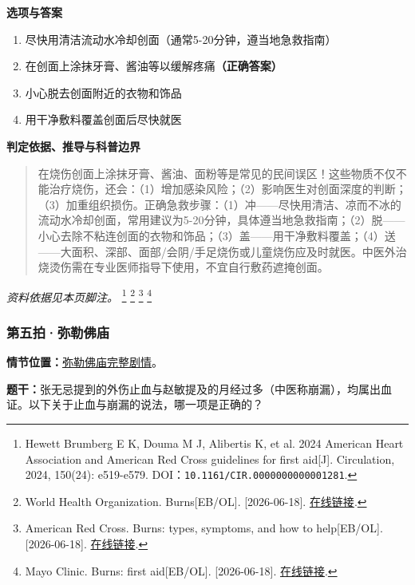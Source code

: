 \textbf{选项与答案}
\begin{enumerate}[label=\Alph*.,leftmargin=*]
  \item 尽快用清洁流动水冷却创面（通常5-20分钟，遵当地急救指南）
  \item 在创面上涂抹牙膏、酱油等以缓解疼痛\textbf{（正确答案）}
  \item 小心脱去创面附近的衣物和饰品
  \item 用干净敷料覆盖创面后尽快就医
\end{enumerate}
\textbf{判定依据、推导与科普边界}
\begin{quote}在烧伤创面上涂抹牙膏、酱油、面粉等是常见的民间误区！这些物质不仅不能治疗烧伤，还会：（1）增加感染风险；（2）影响医生对创面深度的判断；（3）加重组织损伤。正确急救步骤：（1）冲——尽快用清洁、凉而不冰的流动水冷却创面，常用建议为5-20分钟，具体遵当地急救指南；（2）脱——小心去除不粘连创面的衣物和饰品；（3）盖——用干净敷料覆盖；（4）送——大面积、深部、面部/会阴/手足烧伤或儿童烧伤应及时就医。中医外治烧烫伤需在专业医师指导下使用，不宜自行敷药遮掩创面。\end{quote}
\noindent\textit{资料依据见本页脚注。}
\footnote{Hewett Brumberg E K, Douma M J, Alibertis K, et al. 2024 American Heart Association and American Red Cross guidelines for first aid[J]. Circulation, 2024, 150(24): e519-e579. DOI：\nolinkurl{10.1161/CIR.0000000000001281}.}
\footnote{World Health Organization. Burns[EB/OL]. [2026-06-18]. \href{https://www.who.int/news-room/fact-sheets/detail/burns}{在线链接}.}
\footnote{American Red Cross. Burns: types, symptoms, and how to help[EB/OL]. [2026-06-18]. \href{https://www.redcross.org/take-a-class/resources/learn-first-aid/burns}{在线链接}.}
\footnote{Mayo Clinic. Burns: first aid[EB/OL]. [2026-06-18]. \href{https://www.mayoclinic.org/first-aid/first-aid-burns/basics/art-20056649}{在线链接}.}

\subsubsection{第五拍·弥勒佛庙}\label{question:zhaomin:5}
\textbf{情节位置：}\hyperref[plot:zhaomin:5]{弥勒佛庙完整剧情}。

\textbf{题干：}张无忌提到的外伤止血与赵敏提及的月经过多（中医称崩漏），均属出血证。以下关于止血与崩漏的说法，哪一项是正确的？


